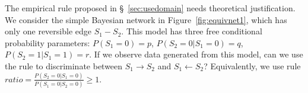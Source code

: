 \documentclass{edm_template}
\begin{document}
The empirical rule proposed in \S~\ref{sec:usedomain} needs theoretical justification.
%
We consider the simple Bayesian network in Figure~\ref{fig:equivnet1}, which has only one reversible edge $S_1-S_2$.
This model has three free conditional probability parameters: $P(S_1=0)=p$, $P(S_2=0|S_1=0)=q$, $P(S_2=1|S_1=1)=r$.
If we observe data generated from this model, 
can we use the rule to discriminate between $S_1\rightarrow S_2$ and $S_1\leftarrow S_2$? %
Equivalently, we use rule $ratio=\frac{P(S_2=0|S_1=0)}{P(S_1=0|S_2=0)}\ge 1$.
\end{document}
